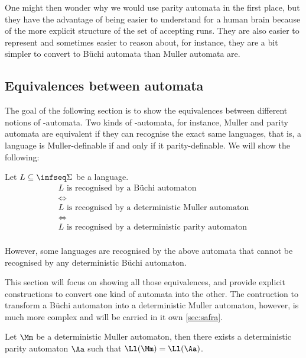 One might then wonder why we would use parity automata in the first place,
but they have the advantage of being easier to understand for a human brain
because of the more explicit structure of the set of accepting runs.
They are also easier to represent and sometimes easier to reason about,
for instance, they are a bit simpler to convert to Büchi automata than Muller automata are.


\subsection{Equivalences between automata}
The goal of the following section is to show the equivalences
between different notions of \w-automata.
Two kinds of \w-automata, for instance, Muller and parity automata
are equivalent if they can recognise the exact same languages,
that is, a language is Muller-definable if and only if it parity-definable.
We will show the following:

\begin{theorem}
    \label{thm:all-automata-are-the-same}
    Let $L \subseteq \infseq\Sigma$ be a language.
    \[
        \begin{array}{c}
        L \text{ is recognised by a Büchi automaton} \\
        \iff \\
        L \text{ is recognised by a deterministic Muller automaton} \\
        \iff \\
        L \text{ is recognised by a deterministic parity automaton} \\
        \end{array}
    \]

    However, some languages are recognised by the above
    automata that cannot be recognised by any deterministic Büchi automaton.
\end{theorem}

This section will focus on showing all those equivalences,
and provide explicit constructions to convert one kind of automata
into the other.
The contruction to transform a Büchi automaton into a deterministic Muller automaton,
however, is much more complex and will be carried in
it own \autoref{sec:safra}.

\begin{lemma}
    \label{lem:muller-to-parity}
    Let $\Mm$ be a deterministic Muller automaton,
    then there exists a deterministic parity automaton $\Aa$
    such that $\Ll(\Mm) = \Ll(\Aa)$.
\end{lemma}

